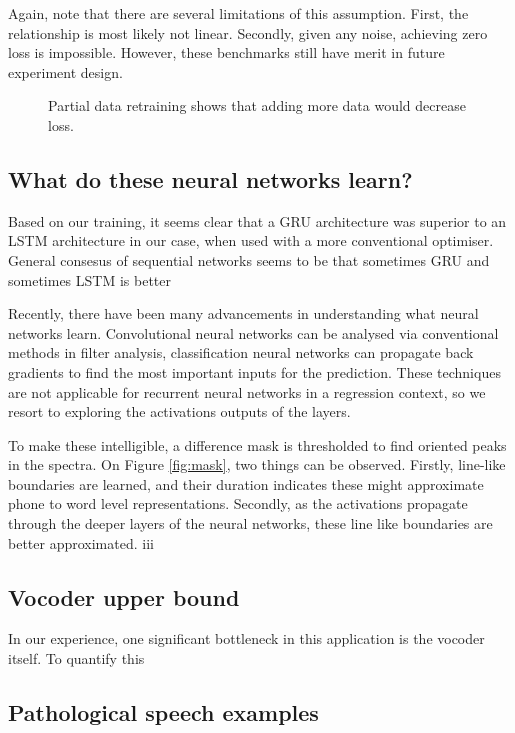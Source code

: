 \documentclass[a4paper]{article}
\begin{document}
Again, note that there are several limitations of this assumption. First, the
relationship is most likely not linear. Secondly, given any noise, achieving
zero loss is impossible. However, these benchmarks still have merit in
future experiment design.

\begin{figure}[t]
  \begin{center}
    \scalebox{0.50}{}
    \caption{Partial data retraining shows that adding more data would
      decrease loss. }
    \label{retraining_linear}
\end{center}
\end{figure}

\subsection{What do these neural networks learn?}

Based on our training, it seems clear that a GRU architecture was superior to an LSTM
architecture in our case, when used with a more conventional optimiser.
General consesus of sequential networks seems to be that sometimes GRU and sometimes LSTM is better
\cite{Jozefowicz2015}

Recently, there have been many advancements in understanding what neural networks learn.
Convolutional neural networks can be analysed via conventional methods in filter analysis,
classification neural networks can propagate back gradients to find the most important inputs for
the prediction. These techniques are not applicable for recurrent neural networks in a regression
context, so we resort to exploring the activations outputs of the layers.

To make these intelligible, a difference mask is thresholded to find oriented peaks in the spectra.
On Figure \ref{fig:mask}, two things can be observed. Firstly, line-like boundaries are learned, and their duration indicates these might approximate phone to word level representations. Secondly, as the activations propagate through the deeper layers of the neural networks, these line like boundaries are better approximated.
iii
\subsection{Vocoder upper bound}

In our experience, one significant bottleneck in this application is
the vocoder itself.  To quantify this
\subsection{Pathological speech examples}
\end{document}
